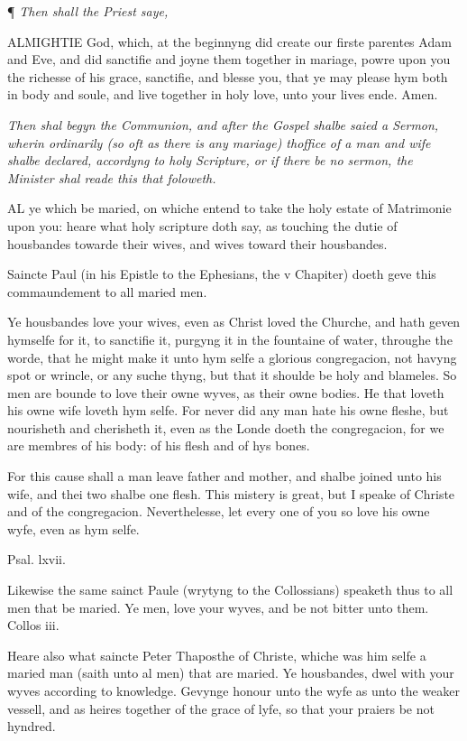 ¶
\emph{Then shall the Priest saye,}

ALMIGHTIE
God, which, at the beginnyng did create our firste parentes Adam and Eve,
and did sanctifie and joyne them together in mariage, powre upon you the
richesse of his grace, sanctifie, and blesse you, that ye may please hym
both in body and soule, and live together in holy love, unto your lives
ende. Amen.

\emph{Then
shal begyn the Communion, and after the Gospel shalbe saied a Sermon,
wherin ordinarily (so oft as there is any mariage) thoffice of a man and
wife shalbe declared, accordyng to holy Scripture, or if there be no sermon,
the Minister shal reade this that foloweth.}

AL
ye which be maried, on whiche entend to take the holy estate of Matrimonie
upon you: heare what holy scripture doth say, as touching the dutie of
housbandes towarde their wives, and wives toward their housbandes.

Saincte Paul (in his Epistle to the Ephesians, the
v Chapiter) doeth geve this commaundement to all maried men.

Ye housbandes love your wives, even as Christ loved
the Churche, and hath geven hymselfe for it, to sanctifie it, purgyng
it in the fountaine of water, throughe the worde, that he might make it
unto hym selfe a glorious congregacion, not havyng spot or wrincle, or
any suche thyng, but that it shoulde be holy and blameles. So men are
bounde to love their owne wyves, as their owne bodies. He that loveth
his owne wife loveth hym selfe. For never did any man hate his owne fleshe,
but nourisheth and cherisheth it, even as the Londe doeth the congregacion,
for we are membres of his body: of his flesh and of hys bones.

For this cause shall a man leave father and mother,
and shalbe joined unto his wife, and thei two shalbe one flesh. This mistery
is great, but I speake of Christe and of the congregacion. Neverthelesse,
let every one of you so love his owne wyfe, even as hym selfe.

Psal. lxvii.

Likewise the same sainct Paule (wrytyng to the Collossians) speaketh thus
to all men that be maried. Ye men, love your wyves, and be not bitter
unto them. Collos
iii.

Heare also what saincte Peter Thaposthe of Christe, whiche was him selfe
a maried man (saith unto al men) that are maried. Ye housbandes, dwel
with your wyves according to knowledge. Gevynge honour unto the wyfe as
unto the weaker vessell, and as heires together of the grace of lyfe,
so that your praiers be not hyndred.

